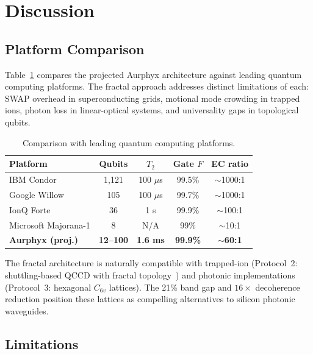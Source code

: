 \documentclass[aps,prx,twocolumn,groupedaddress,longbibliography]{revtex4-2}
\theoremstyle{plain}
\theoremstyle{definition}
\begin{document}
\section{Discussion}
\label{sec:discussion}

\subsection{Platform Comparison}

Table~\ref{tab:comparison} compares the projected Aurphyx architecture against leading quantum computing platforms. The fractal approach addresses distinct limitations of each: SWAP overhead in superconducting grids, motional mode crowding in trapped ions, photon loss in linear-optical systems, and universality gaps in topological qubits.

\begin{table}[h]
\caption{Comparison with leading quantum computing platforms.}
\label{tab:comparison}
\begin{ruledtabular}
\begin{tabular}{lcccc}
\textbf{Platform} & \textbf{Qubits} & \textbf{$T_2$} & \textbf{Gate $F$} & \textbf{EC ratio} \\
\hline
IBM Condor & 1,121 & 100 $\mu$s & 99.5\% & $\sim$1000:1 \\
Google Willow & 105 & 100 $\mu$s & 99.7\% & $\sim$1000:1 \\
IonQ Forte & 36 & 1 s & 99.9\% & $\sim$100:1 \\
Microsoft Majorana-1 & 8 & N/A & 99\% & $\sim$10:1 \\
\textbf{Aurphyx (proj.)} & \textbf{12--100} & \textbf{1.6 ms} & \textbf{99.9\%} & $\mathbf{\sim}$\textbf{60:1} \\
\end{tabular}
\end{ruledtabular}
\end{table}

The fractal architecture is naturally compatible with trapped-ion (Protocol~2: shuttling-based QCCD with fractal topology~\cite{Monroe2013}) and photonic implementations (Protocol~3: hexagonal $C_{6v}$ lattices). The 21\% band gap and $16\times$ decoherence reduction position these lattices as compelling alternatives to silicon photonic waveguides.

\subsection{Limitations}
\end{document}
